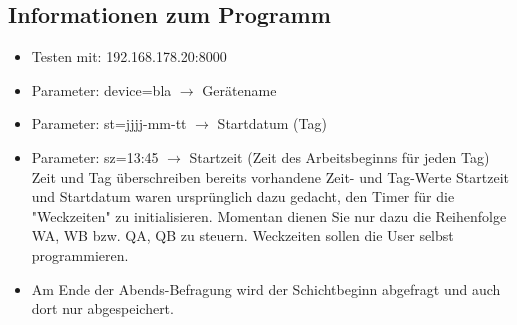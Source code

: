 \documentclass[a4paper]{scrartcl}
\begin{document}
		\subsection{Informationen zum Programm}
			\begin{itemize}
				\item Testen mit: 192.168.178.20:8000
				\item Parameter: device=bla $\rightarrow$ Gerätename
				\item Parameter: st=jjjj-mm-tt $\rightarrow$ Startdatum (Tag)
				\item Parameter: sz=13:45 $\rightarrow$ Startzeit (Zeit des Arbeitsbeginns für jeden Tag)\newline
					Zeit und Tag überschreiben bereits vorhandene Zeit- und Tag-Werte\newline
					Startzeit und Startdatum waren ursprünglich dazu gedacht, den Timer für die "Weckzeiten" zu initialisieren. Momentan dienen Sie nur dazu die Reihenfolge WA, WB bzw. QA, QB zu steuern. Weckzeiten sollen die User selbst programmieren.
				\item Am Ende der Abends-Befragung wird der Schichtbeginn abgefragt und auch dort nur abgespeichert.
			\end{itemize}
\end{document}
